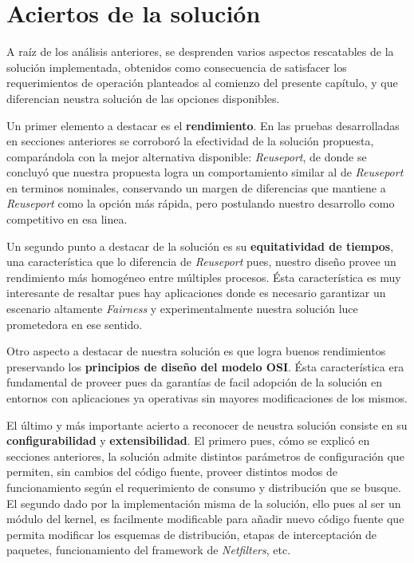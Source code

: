 \section{Aciertos de la solución}

A raíz de los análisis anteriores, se desprenden varios aspectos rescatables de la solución implementada, obtenidos como consecuencia de satisfacer los requerimientos de operación planteados al comienzo del presente capítulo, y que diferencian neustra solución de las opciones disponibles.

Un primer elemento a destacar es el \textbf{rendimiento}. En las pruebas desarrolladas en secciones anteriores se corroboró la efectividad de la solución propuesta, comparándola con la mejor alternativa disponible: \emph{Reuseport}, de donde se concluyó que nuestra propuesta logra un comportamiento similar al de \emph{Reuseport} en terminos nominales, conservando un margen de diferencias que mantiene a \emph{Reuseport} como la opción más rápida, pero postulando nuestro desarrollo como competitivo en esa linea.

Un segundo punto a destacar de la solución es su \textbf{equitatividad de tiempos}, una característica que lo diferencia de \emph{Reuseport} pues, nuestro diseño provee un rendimiento más homogéneo entre múltiples procesos. Ésta característica es muy interesante de resaltar pues hay aplicaciones donde es necesario garantizar un escenario altamente \emph{Fairness} y experimentalmente nuestra solución luce prometedora en ese sentido.

Otro aspecto a destacar de nuestra solución es que logra buenos rendimientos preservando los \textbf{principios de diseño del modelo OSI}. Ésta característica era fundamental de proveer pues da garantías de facil adopción de la solución en entornos con aplicaciones ya operativas sin mayores modificaciones de los mismos.

El último y más importante acierto a reconocer de neustra solución consiste en su \textbf{configurabilidad} y \textbf{extensibilidad}. El primero pues, cómo se explicó en secciones anteriores, la solución admite distintos parámetros de configuración que permiten, sin cambios del código fuente, proveer distintos modos de funcionamiento según el requerimiento de consumo y distribución que se busque. El segundo dado por la implementación misma de la solución, ello pues al ser un módulo del kernel, es facilmente modificable para añadir nuevo código fuente que permita modificar los esquemas de distribución, etapas de interceptación de paquetes, funcionamiento del framework de \emph{Netfilters}, etc.

